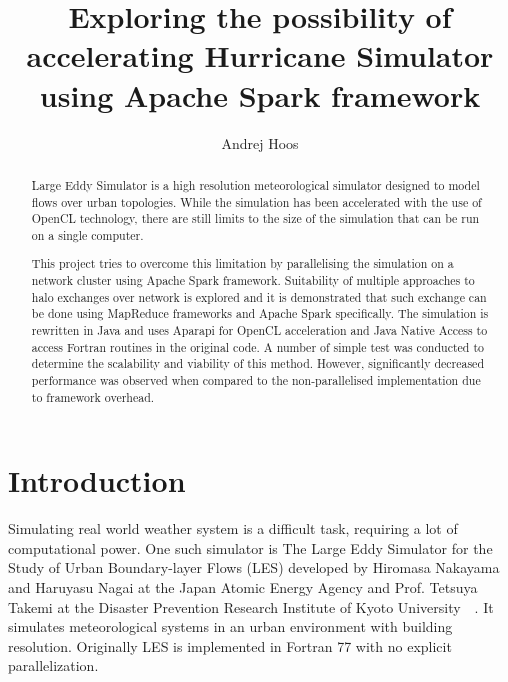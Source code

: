 \documentclass{l4proj}
\begin{document}
\title{Exploring the possibility of accelerating Hurricane Simulator \\ using Apache Spark framework}
\author{Andrej Hoos}
\maketitle

\begin{abstract}
Large Eddy Simulator is a high resolution meteorological simulator designed to model
flows over urban topologies. While the simulation has been accelerated with the use of 
OpenCL technology, there are still limits to the size of the simulation that can be run on a single computer.

This project tries to overcome this limitation by parallelising the simulation on a 
network cluster using Apache Spark framework. Suitability of multiple approaches to 
halo exchanges over network is explored and it is demonstrated that such exchange 
can be done using MapReduce frameworks and Apache Spark specifically. The simulation 
is rewritten in Java and uses Aparapi for OpenCL acceleration and Java Native Access 
to access Fortran routines in the original code. A number of simple test was conducted 
to determine the scalability and viability of this method. However, significantly 
decreased performance was observed when compared to the non-parallelised implementation 
due to framework overhead.
\end{abstract}

\educationalconsent
%
%
\tableofcontents

\chapter{Introduction}

Simulating real world weather system is a difficult task, requiring a lot of computational power.
One such simulator is The Large Eddy Simulator for the Study of Urban Boundary-layer Flows (LES)
developed by  Hiromasa Nakayama and Haruyasu Nagai at the Japan Atomic Energy Agency
and Prof. Tetsuya Takemi at the Disaster Prevention Research Institute of Kyoto University~\cite{les_analysis}~\cite{les}.
It simulates meteorological systems in an urban environment with building resolution.
Originally LES is implemented in Fortran 77 with no explicit parallelization.
\end{document}

